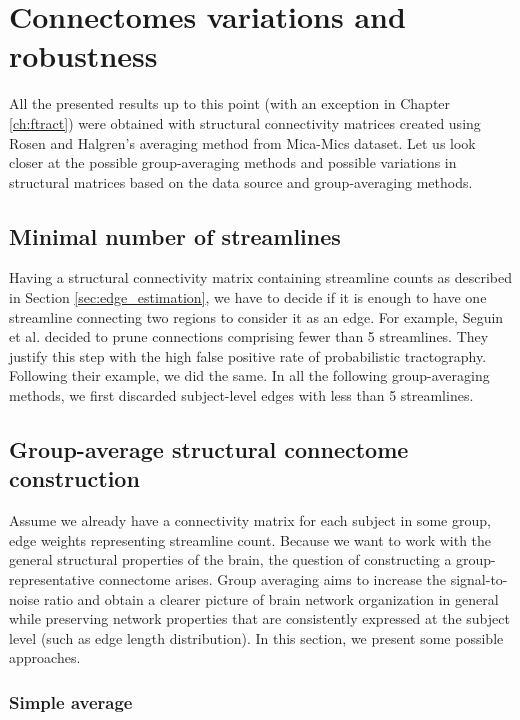 \chapter{Connectomes variations and  robustness}\label{ch:SC_indepth}

All the presented results up to this point (with an exception in Chapter \ref{ch:ftract}) were obtained with structural connectivity matrices created using Rosen and Halgren's averaging method from Mica-Mics dataset. Let us look closer at the possible group-averaging methods and possible variations in structural matrices based on the data source and group-averaging methods. 

\section{Minimal number of streamlines}\label{sec:min_streamlines}

Having a structural connectivity matrix containing streamline counts as described in Section \ref{sec:edge_estimation}, we have to decide if it is enough to have one streamline connecting two regions to consider it as an edge. For example, Seguin et al. \cite{seguin_communication_2023} decided to prune connections comprising fewer than 5 streamlines. They justify this step with the high false positive rate of probabilistic tractography. Following their example, we did the same. In all the following group-averaging methods, we first discarded subject-level edges with less than 5 streamlines.

\section{Group-average structural connectome construction}\label{sec:group-avg}

Assume we already have a connectivity matrix for each subject in some group, edge weights representing streamline count. Because we want to work with the general structural properties of the brain, the question of constructing a group-representative connectome arises. Group averaging aims to increase the signal-to-noise ratio and obtain a clearer picture of brain network organization in general while preserving network properties that are consistently expressed at the subject level (such as edge length distribution). \cite{betzel_distance-dependent_2019} In this section, we present some possible approaches.

\subsection{Simple average}\label{sec:average}

